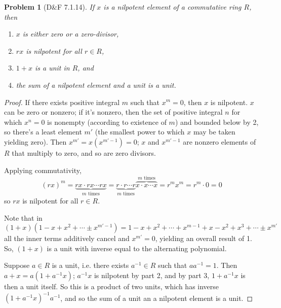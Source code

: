 \documentclass{article}
\newtheorem{problem}{Problem}
\begin{document}
\begin{problem}[D\&F 7.1.14]
  If $x$ is a nilpotent element of a commutative ring $R$, then
  \begin{enumerate}
  \item $x$ is either zero or a zero-divisor,
  \item $rx$ is nilpotent for all $r \in R$,
  \item $1 + x$ is a unit in $R$, and
  \item the sum of a nilpotent element and a unit is a unit.
  \end{enumerate}
\end{problem}

\begin{proof}
  If there exists positive integral $m$ such that $x^{m} = 0$, then $x$ is nilpotent.
  $x$ can be zero or nonzero; if it's nonzero, then the set of positive integral $n$ for which $x^{n} = 0$ is nonempty (according to existence of $m$)
  and bounded below by 2, so there's a least element $m'$ (the smallest power to which $x$ may be taken yielding zero).
  Then $x^{m'} = x(x^{m'-1}) = 0$;  $x$ and $x^{m'-1}$ are nonzero elements of $R$ that multiply to zero, and so are zero divisors.

  Applying commutativity,
  \[
    (rx)^{m} = \underbrace{rx \cdot rx \cdots  rx}_{m\text{ times}}
    = \underbrace{r\cdot r \cdots r}_{m\text{ times}}\overbrace{x \cdot x \cdots x}^{m\text{ times}} = r^{m}x^{m} = r^{m} \cdot 0 = 0
  \]
  so $rx$ is nilpotent for all $r \in R$.

  Note that in
  \[
    (1 + x)(1 - x + x^{2} + \cdots \pm x^{m'-1}) = 1 - x + x^{2} + \cdots + x^{m - 1} + x - x^{2} + x^{3} + \cdots \pm x^{m'}
  \]
  all the inner terms additively cancel and $x^{m'} = 0$, yielding an overall result of 1.
  So, $(1 + x)$ is a unit with inverse equal to the alternating polynomial.

  Suppose $a \in R$ is a unit, i.e. there exists $a^{-1} \in R$ such that $aa^{-1} = 1$.
  Then $a + x = a(1 + a^{-1}x)$; $a^{-1}x$ is nilpotent by part 2, and by part 3, $1 + a^{-1}x$ is then a unit itself.
  So this is a product of two units, which has inverse $(1 + a^{-1}x)^{-1}a^{-1}$, and so the sum of a unit an a nilpotent element is a unit.
\end{proof}
\end{document}
